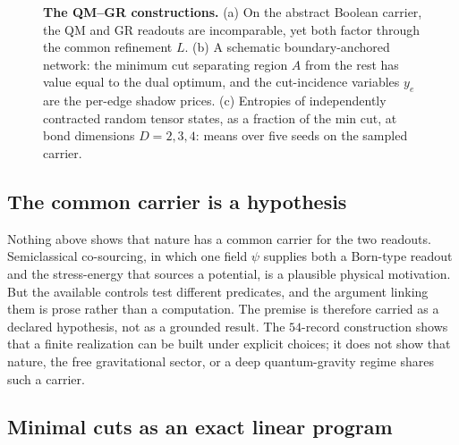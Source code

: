 \documentclass[11pt]{article}
\theoremstyle{definition}
\begin{document}
\begin{figure}[tbp]
\caption{\textbf{The QM--GR constructions.} (a) On the abstract Boolean carrier, the QM and GR readouts are
incomparable, yet both factor through the common refinement \(L\). (b) A schematic boundary-anchored network: the
minimum cut separating region \(A\) from the rest has value equal to the dual optimum, and the cut-incidence variables
\(y_e\) are the per-edge shadow prices. (c) Entropies of independently contracted random tensor states, as a fraction of
the min cut, at bond dimensions \(D=2,3,4\): means over five seeds on the sampled carrier.}
\label{fig:qmgr}
\end{figure}
 
\subsection{The common carrier is a hypothesis}\label{grounding-the-premise}

Nothing above shows that nature has a common carrier for the two readouts. Semiclassical co-sourcing, in which one
field \(\psi\) supplies both a Born-type readout and the stress-energy that sources a potential, is a plausible
physical motivation. But the available controls test different predicates, and the argument linking them is prose
rather than a computation. The premise is therefore carried as a declared hypothesis, not as a grounded result. The
\(54\)-record construction shows that a finite realization can be built under explicit choices; it does not show that
nature, the free gravitational sector, or a deep quantum-gravity regime shares such a carrier.

\subsection{Minimal cuts as an exact linear program}\label{recognition-ryutakayanagi-as-ledgershadow-price-duality}
\end{document}
